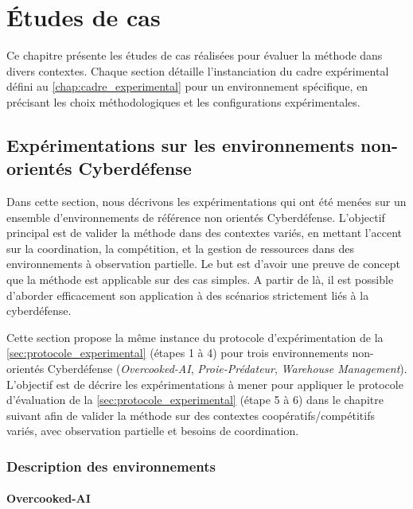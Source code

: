 \chapter{Études de cas}
\label{chap:case_studies}

Ce chapitre présente les études de cas réalisées pour évaluer la méthode  dans divers contextes. Chaque section détaille l'instanciation du cadre expérimental défini au \autoref{chap:cadre_experimental} pour un environnement spécifique, en précisant les choix méthodologiques et les configurations expérimentales.

\section{Expérimentations sur les environnements non-orientés Cyberdéfense}

Dans cette section, nous décrivons les expérimentations qui ont été menées sur un ensemble d'environnements de référence non orientés Cyberdéfense. L'objectif principal est de valider la méthode  dans des contextes variés, en mettant l'accent sur la coordination, la compétition, et la gestion de ressources dans des environnements à observation partielle. Le but est d'avoir une preuve de concept que la méthode  est applicable sur des cas simples. A partir de là, il est possible d'aborder efficacement son application à des scénarios strictement liés à la cyberdéfense.

Cette section propose la même instance du protocole d'expérimentation de la \autoref{sec:protocole_experimental} (étapes 1 à 4) pour trois environnements non-orientés Cyberdéfense (\textit{Overcooked-AI}, \textit{Proie-Prédateur}, \textit{Warehouse Management}).
L’objectif est de décrire les expérimentations à mener pour appliquer le protocole d'évaluation de la \autoref{sec:protocole_experimental} (étape 5 à 6) dans le chapitre suivant afin de valider la méthode  sur des contextes coopératifs/compétitifs variés, avec observation partielle et besoins de coordination.


\subsection{Description des environnements}

\subsubsection*{Overcooked-AI}

